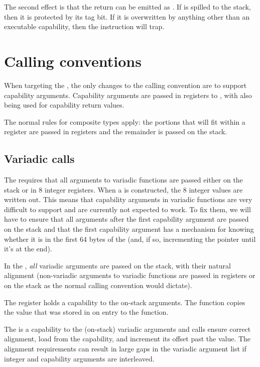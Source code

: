 The second effect is that the return can be emitted as .%
If  is spilled to the stack, then it is protected by its tag bit.
If it is overwritten by anything other than an executable capability, then the  instruction will trap.

\section{Calling conventions}

When targeting the \mipsABI{}, the only changes to the calling convention are to support capability arguments.
Capability arguments are passed in registers  to , with  also being used for capability return values.

The normal rules for composite types apply: the portions that will fit within a register are passed in registers and the remainder is passed on the stack.

\subsection{Variadic calls}

The \mipsABI{} requires that all arguments to variadic functions are passed either on the stack or in 8 integer registers.
When a  is constructed, the 8 integer values are written out.
This means that capability arguments in variadic functions are very difficult to support and are currently not expected to work.
To fix them, we will have to ensure that all arguments after the first capability argument are passed on the stack and that the first capability argument has a mechanism for knowing whether it is in the first 64 bytes of the  (and, if so, incrementing the pointer until it's at the end).

In the \sandboxABI{}, \textit{all} variadic arguments are passed on the stack, with their natural alignment (non-variadic arguments to variadic functions are passed in registers or on the stack as the normal calling convention would dictate).

The  register holds a capability to the on-stack arguments.
The  function copies the value that was stored in  on entry to the function.

The  is a capability to the (on-stack) variadic arguments and  calls ensure correct alignment, load from the capability, and increment its offset past the value.
The alignment requirements can result in large gaps in the variadic argument list if integer and capability arguments are interleaved.

